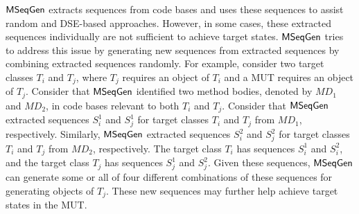 $\textsf{MSeqGen} $ extracts sequences from code bases and uses these sequences to assist random and DSE-based approaches. However, in some cases, these extracted sequences individually are not sufficient to achieve target states. $\textsf{MSeqGen} $ tries to address this issue by generating new sequences from extracted sequences by combining extracted sequences randomly. For example, consider two target classes $T_i$ and $T_j$, where $T_j$ requires an object of $T_i$ and a MUT requires an object of $T_j$. Consider that $\textsf{MSeqGen} $ identified two method bodies, denoted by $MD_1$ and $MD_2$, in code bases relevant to both $T_i$ and $T_j$. Consider that $\textsf{MSeqGen} $ extracted sequences $S_i^1$ and $S_j^1$ for target classes $T_i$ and $T_j$ from $MD_1$, respectively. Similarly, $\textsf{MSeqGen} $ extracted sequences $S_i^2$ and $S_j^2$ for target classes $T_i$ and $T_j$ from $MD_2$, respectively. The target class $T_i$ has sequences $S_i^1$ and $S_i^2$, and the target class $T_j$ has sequences $S_j^1$ and $S_j^2$. Given these sequences, $\textsf{MSeqGen} $ can generate some or all of four different combinations of these sequences for generating objects of $T_j$. These new sequences may further help achieve target states in the MUT.

